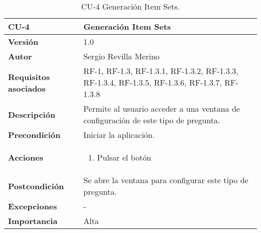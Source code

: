\begin{table}[h]
	\centering
	\begin{tabularx}{\linewidth}{ p{} p{} }
		\toprule
		\textbf{CU-4}    & \textbf{Generación Item Sets}\\
		\toprule
		\textbf{Versión}              & 1.0    \\
		\textbf{Autor}                & Sergio Revilla Merino \\
		\textbf{Requisitos asociados} & RF-1, RF-1.3, RF-1.3.1, RF-1.3.2, RF-1.3.3, RF-1.3.4, RF-1.3.5, RF-1.3.6, RF-1.3.7, RF-1.3.8 \\
		\textbf{Descripción}          & Permite al usuario acceder a una ventana de configuración de este tipo de pregunta.  \\
		\textbf{Precondición}         & Iniciar la aplicación. \\
		\textbf{Acciones}             &
		\begin{enumerate}
			\def\labelenumi{\arabic{enumi}.}
			\tightlist
            \item Pulsar el botón
		\end{enumerate} \\
		\textbf{Postcondición}        & Se abre la ventana para configurar este tipo de pregunta. \\
		\textbf{Excepciones}          & - \\
		\textbf{Importancia}          & Alta \\
		\bottomrule
	\end{tabularx}
	\caption{CU-4 Generación Item Sets.}
\end{table}

